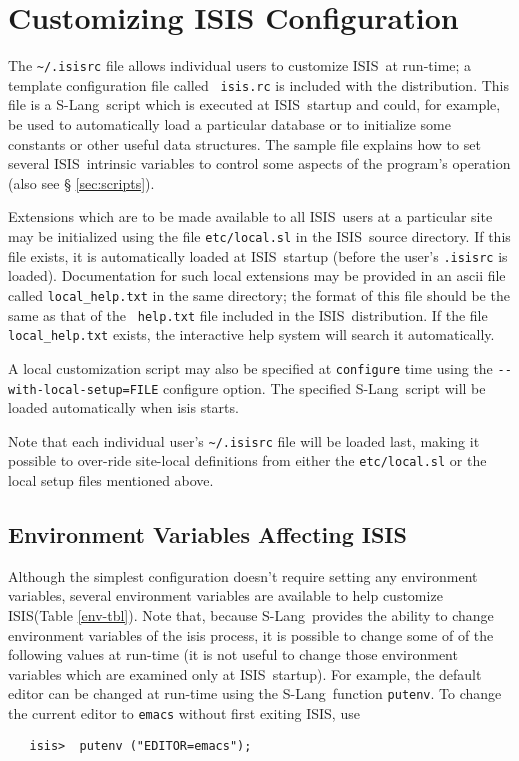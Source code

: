 \documentclass{book}
\newcommand{\isisx}{{\sc ISIS~}}
\newcommand{\isis}{{\sc ISIS}}
\newcommand{\slang}{{\sc S-Lang}}
\begin{document}
\chapter{Customizing ISIS Configuration}
\label{chap:custom}

The \verb|~/.isisrc| file allows individual users to customize
\isisx at run-time; a template configuration file called {\tt
isis.rc} is included with the distribution. This file is a \slang{}ript which is executed at \isisx startup and could, for example,
be used to automatically load a particular database or to
initialize some constants or other useful data structures. The
sample file explains how to set several \isisx intrinsic variables
to control some aspects of the program's operation (also see \S
\ref{sec:scripts}).

Extensions which are to be made
available to all \isisx users at a particular site may be
initialized using the file {\tt etc/local.sl} in the \isisx source
directory. If this file exists, it is automatically loaded at
\isisx startup (before the user's {\tt .isisrc} is loaded).
Documentation for such local extensions may be provided in an
ascii file called {\tt local\_help.txt} in the same directory; the
format of this file should be the same as that of the {\tt
help.txt} file included in the \isisx distribution.  If the file
{\tt local\_help.txt} exists, the interactive help system will
search it automatically.

A local customization script may also be specified at \verb|configure| time
using the \verb|--with-local-setup=FILE| configure option.  The
specified \slang{}ript will be loaded automatically when
isis starts.

Note that each individual user's \verb|~/.isisrc| file will be loaded last,
making it possible to over-ride site-local definitions from either the
\verb|etc/local.sl| or the local setup files mentioned above.

\section{Environment Variables Affecting ISIS}
\label{sec:env-var}

Although the simplest configuration doesn't require setting any
environment variables, several environment variables are available to
help customize \isis (Table \ref{env-tbl}).  Note that, because \slang\
provides the ability to change environment variables of the isis process, it
is possible to change some of of the following values at run-time
(it is not useful to change those environment variables which are examined
only at \isisx startup).  For example, the default editor can be changed at
run-time using the \slang\ function {\tt putenv}.  To change the current
editor to {\tt emacs} without first exiting \isis, use
\begin{verbatim}
   isis>  putenv ("EDITOR=emacs");
\end{verbatim}
\end{document}
